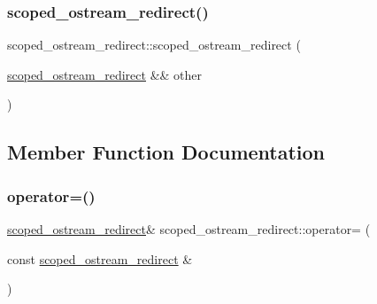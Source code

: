 \mbox{\label{classscoped__ostream__redirect_a2c7e1be131aaf58cc07bd103b376c500}} 
\subsubsection{\texorpdfstring{scoped\_ostream\_redirect()}{scoped\_ostream\_redirect()}\hspace{0.1cm}{\footnotesize\ttfamily [3/3]}}
{\footnotesize\ttfamily scoped\+\_\+ostream\+\_\+redirect\+::scoped\+\_\+ostream\+\_\+redirect (\begin{DoxyParamCaption}\item[{\mbox{\hyperlink{classscoped__ostream__redirect}{scoped\+\_\+ostream\+\_\+redirect}} \&\&}]{other }\end{DoxyParamCaption})\hspace{0.3cm}{\ttfamily [default]}}



\subsection{Member Function Documentation}
\mbox{\label{classscoped__ostream__redirect_a803809f8dbe73390bec2856a3cecb088}} 
\subsubsection{\texorpdfstring{operator=()}{operator=()}\hspace{0.1cm}{\footnotesize\ttfamily [1/2]}}
{\footnotesize\ttfamily \mbox{\hyperlink{classscoped__ostream__redirect}{scoped\+\_\+ostream\+\_\+redirect}}\& scoped\+\_\+ostream\+\_\+redirect\+::operator= (\begin{DoxyParamCaption}\item[{const \mbox{\hyperlink{classscoped__ostream__redirect}{scoped\+\_\+ostream\+\_\+redirect}} \&}]{ }\end{DoxyParamCaption})\hspace{0.3cm}{\ttfamily [delete]}}

